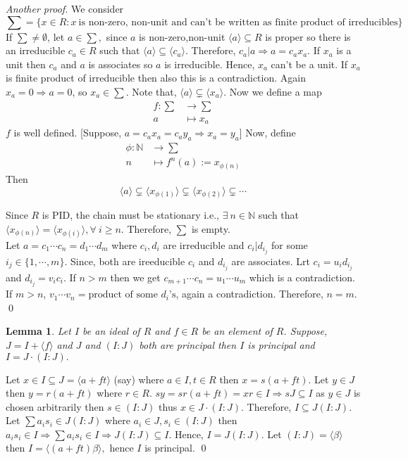 \documentclass[11pt]{amsart}
\newtheorem{lemma}[theorem]{Lemma}%
\newcommand{\NN}{\mathbb N}
\newcommand{\gen}[1]{\langle#1\rangle}
\begin{document}
\textit{Another proof.} We consider $$\sum=\{x\in R: x~\text{is non-zero, non-unit and can't be written as finite product of irreducibles}\}$$ If $\sum \neq \emptyset$, let $a\in \sum,$ since $a$ is non-zero,non-unit $\gen{a}\subseteq R$ is proper so there is an irreducible $c_a\in R$ such that $\gen{a}\subseteq \gen{c_a}.$ Therefore, $c_a|a \Rightarrow a=c_ax_a.$ If $x_a$ is a unit then $c_a$ and $a$ is associates so $a$ is irreducible. Hence, $x_a$ can't be a unit. If $x_a$ is finite product of irreducible then also this is a contradiction. Again $x_a=0 \Rightarrow a=0$, so $x_a\in \sum.$ Note that, $\gen{a}\subsetneq \gen{x_a}.$ Now we define a map \begin{align*}
f:\sum &\to \sum\\
a&\mapsto x_a
\end{align*}
$f$ is well defined. [Suppose, $a=c_ax_a=c_ay_a \Rightarrow x_a=y_a$]
Now, define \begin{align*}
\phi:{\NN}&\to \sum\\
n&\mapsto f^n(a):=x_{\phi(n)}
\end{align*}
Then \begin{equation}
\gen{a}\subsetneq \gen{x_{\phi(1)}}\subsetneq \gen{x_{\phi(2)}}\subsetneq \cdots 
\end{equation}

Since $R$ is PID, the chain must be stationary i.e., $\exists~n\in {\NN}$ such that $\gen{x_{\phi(n)}}=\gen{x_{\phi(i)}},\forall~i\geq n$. Therefore, $\sum$ is empty.\\
Let $a=c_1\cdots c_n=d_1\cdots d_m$ where $c_i,d_i$ are irreducible and $c_i|d_{i_j}$ for some $i_j\in \{1,\cdots ,m\}$. Since, both are ireeducible $c_i$ and $d_{i_j}$ are associates. Lrt $c_i=u_id_{i_j}$ and $d_{i_j}=v_ic_i$. If $n>m$ then we get $c_{m+1} \cdots c_n=u_1\cdots u_m$ which is a contradiction. If $m>n$, $v_1\cdots v_n=\text{product of some $d_i$'s}$, again a contradiction. Therefore, $n=m.$  \qed

\begin{lemma}

Let $I$ be an ideal of $R$ and $f\in R$ be an element of $R$. Suppose, $J=I+\gen{f}$ and $J$ and $(I:J)$ both are principal then $I$ is principal and $I=J\cdot (I:J).$

\end{lemma}

\proof Let $x\in I\subseteq J=\gen{a+ft}$ (say) where $a\in I,t\in R$ then $x=s(a+ft).$ Let $y\in J$ then $y=r(a+ft)$ where $r\in R.$ $sy=sr(a+ft)=xr\in I \Rightarrow sJ\subseteq I$ as $y\in J$ is chosen arbitrarily then $s\in (I:J)$ thus $x\in J\cdot (I:J)$. Therefore, $I\subseteq J(I:J).$ Let $\sum a_is_i\in J(I:J)$ where $a_i\in J,s_i\in (I:J)$ then $a_is_i\in I \Rightarrow \sum a_is_i\in I \Rightarrow J(I:J)\subseteq I$. Hence, $I=J(I:J).$ Let $(I:J)=\gen{\beta}$ then $I=\gen{(a+ft)\beta},$ hence $I$ is principal. \qed
\end{document}
